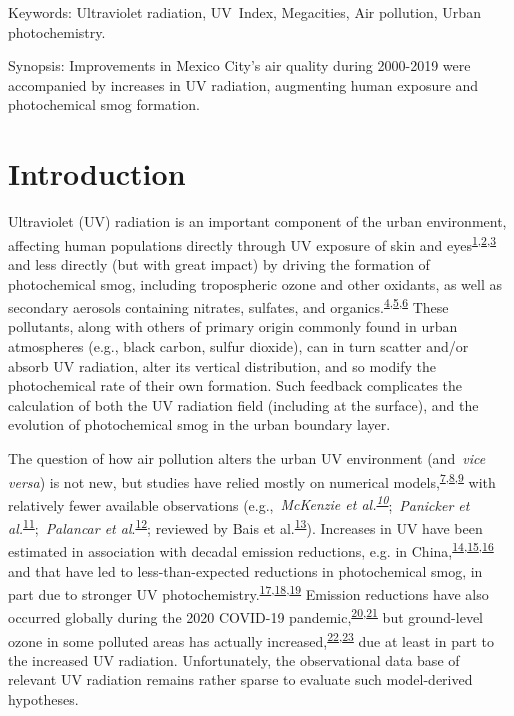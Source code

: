 \documentclass[10pt]{article}
\begin{document}
\sloppy


Keywords: Ultraviolet radiation, UV~Index, Megacities, Air pollution,
Urban photochemistry.

Synopsis: Improvements in Mexico City's air quality during 2000-2019
were accompanied by increases in UV radiation, augmenting human exposure
and photochemical smog formation.

\section*{Introduction}

{\label{123750}}

Ultraviolet (UV) radiation is an important component of the urban
environment, affecting human populations directly through UV exposure of
skin and eyes\textsuperscript{\hyperref[csl:1]{1},\hyperref[csl:2]{2},\hyperref[csl:3]{3}} and less directly (but with great
impact) by driving the formation of photochemical smog, including
tropospheric ozone and other oxidants, as well as secondary aerosols
containing nitrates, sulfates, and organics.\textsuperscript{\hyperref[csl:4]{4},\hyperref[csl:5]{5},\hyperref[csl:6]{6}} These
pollutants, along with others of primary origin commonly found in urban
atmospheres (e.g., black carbon, sulfur dioxide), can in turn scatter
and/or absorb UV radiation, alter its vertical distribution, and so
modify the photochemical rate of their own formation. Such feedback
complicates the calculation of both the UV radiation field (including at
the surface), and the evolution of photochemical smog in the urban
boundary layer.

The question of how air pollution alters the urban UV environment
(and~\emph{vice versa}) is not new, but studies have relied mostly on
numerical models,\textsuperscript{\hyperref[csl:7]{7},\hyperref[csl:8]{8},\hyperref[csl:9]{9}} with relatively fewer available
observations (e.g.,~\emph{McKenzie et
al.\textsuperscript{\hyperref[csl:10]{10}}};~\emph{Panicker et
al.}\textsuperscript{\hyperref[csl:11]{11}};~\emph{Palancar et al}.\textsuperscript{\hyperref[csl:12]{12}};
reviewed by Bais et al.\textsuperscript{\hyperref[csl:13]{13}}). Increases in UV have been
estimated in association with decadal emission reductions, e.g. in
China,\textsuperscript{\hyperref[csl:14]{14},\hyperref[csl:15]{15},\hyperref[csl:16]{16}} and that have led to less-than-expected
reductions in photochemical smog, in part due to stronger UV
photochemistry.\textsuperscript{\hyperref[csl:17]{17},\hyperref[csl:18]{18},\hyperref[csl:19]{19}} Emission reductions have also occurred
globally during the 2020 COVID-19 pandemic,\textsuperscript{\hyperref[csl:20]{20},\hyperref[csl:21]{21}} but
ground-level ozone in some polluted areas has actually
increased,\textsuperscript{\hyperref[csl:22]{22},\hyperref[csl:23]{23}} due at least in part to the increased UV
radiation. Unfortunately, the observational data base of relevant UV
radiation remains rather sparse to evaluate such model-derived
hypotheses.~~
\end{document}
